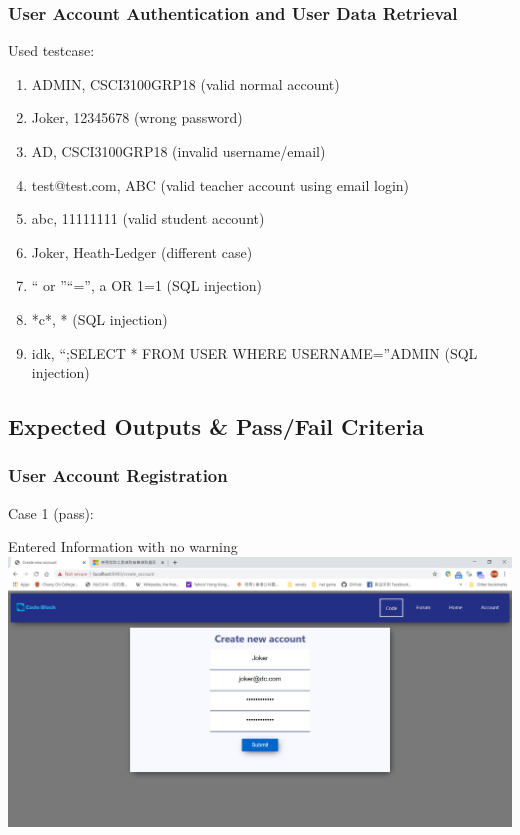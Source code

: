 \subsubsection{User Account Authentication and User Data Retrieval}
Used testcase:
\begin{enumerate}
  \item ADMIN, CSCI3100GRP18 (valid normal account)
  \item Joker, 12345678 (wrong password)
  \item AD, CSCI3100GRP18 (invalid username/email)
  \item test@test.com, ABC (valid teacher account using email login)
  \item abc, 11111111 (valid student account)
  \item Joker, Heath-Ledger (different case)
  \item `` or ''``='', a OR 1=1 (SQL injection)
  \item *c*, * (SQL injection)
  \item idk, ``;SELECT * FROM USER WHERE USERNAME=''ADMIN (SQL injection)
\end{enumerate}

\subsection{Expected Outputs \& Pass/Fail Criteria}
\subsubsection{User Account Registration}

Case 1 (pass):

Entered Information with no warning\\
\includegraphics[scale=0.45]{Doc/Pics/case-5-1-1}

